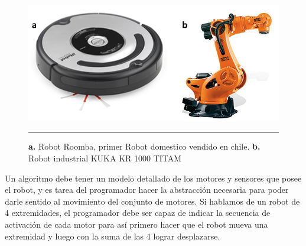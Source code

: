 \begin{figure}[htbp]
	\centering
		\includegraphics[width=\textwidth]{./Figures/RobotsInd.png}
		\rule{35em}{0.5pt}
	\caption[Robots Roomba y KUKA]{\textbf{a. }Robot Roomba, primer Robot domestico vendido en chile. \textbf{b.} Robot industrial KUKA KR 1000 TITAM}
	\label{fig:Roomba y KUKA}
\end{figure}

Un algoritmo debe tener un modelo detallado de los motores y sensores que posee el robot, y es tarea del programador hacer la abstracción necesaria para poder darle sentido al movimiento del conjunto de motores. Si hablamos de un robot de 4 extremidades, el programador debe ser capaz de indicar la secuencia de activación de cada motor para así  primero hacer que el robot mueva una extremidad y luego con la suma de las 4 lograr desplazarse.





